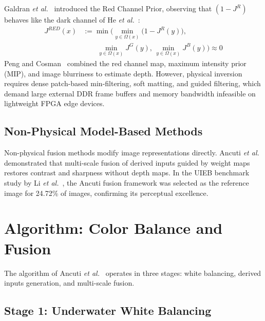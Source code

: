 \documentclass[10pt,twocolumn,letterpaper]{article}
\begin{document}
Galdran \emph{et al.}~\cite{galdran2015automatic} introduced the Red Channel Prior, observing that $(1-J^R)$ behaves like the dark channel of He \emph{et al.}~\cite{he2009dark}:
\begin{equation}
  \begin{aligned}
    J^{RED}(x) &:= \min\!\Biggl(\min_{y\in\Omega(x)}\bigl(1-J^R(y)\bigr), \\
    &\qquad \min_{y\in\Omega(x)} J^G(y), \, \min_{y\in\Omega(x)} J^B(y)\Biggr) \approx 0
  \end{aligned}
  \label{eq:redchannel}
\end{equation}
Peng and Cosman~\cite{peng2017underwater} combined the red channel map, maximum intensity prior (MIP), and image blurriness to estimate depth. However, physical inversion requires dense patch-based min-filtering, soft matting, and guided filtering, which demand large external DDR frame buffers and memory bandwidth infeasible on lightweight FPGA edge devices.

\subsection{Non-Physical Model-Based Methods}

Non-physical fusion methods modify image representations directly. Ancuti \emph{et al.}~\cite{ancuti2012enhancing, ancuti2018color} demonstrated that multi-scale fusion of derived inputs guided by weight maps restores contrast and sharpness without depth maps. In the UIEB benchmark study by Li \emph{et al.}~\cite{li2020underwater}, the Ancuti fusion framework was selected as the reference image for 24.72\% of images, confirming its perceptual excellence.

\section{Algorithm: Color Balance and Fusion}
\label{sec:algorithm}

The algorithm of Ancuti \emph{et al.}~\cite{ancuti2018color} operates in three stages: white balancing, derived inputs generation, and multi-scale fusion.

\subsection{Stage 1: Underwater White Balancing}
\end{document}
